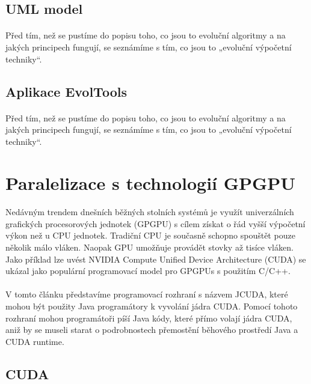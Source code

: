 \documentclass[bc,male,java,dept460]{diploma}		%
\begin{document}
\subsection{UML model}
\paragraph*{}
Před tím, než se pustíme do popisu toho, co jsou to evoluční algoritmy a na jakých principech fungují, se seznámíme s tím, co jsou to „evoluční výpočetní techniky“.

\subsection{Aplikace EvolTools}
\paragraph*{}
Před tím, než se pustíme do popisu toho, co jsou to evoluční algoritmy a na jakých principech fungují, se seznámíme s tím, co jsou to „evoluční výpočetní techniky“.

\section{Paralelizace s technologií GPGPU}
\paragraph*{}
Nedávným trendem dnešních běžných stolních systémů je využít univerzálních grafických procesorových jednotek (GPGPU) s cílem získat o řád vyšší výpočetní výkon než u CPU jednotek. Tradiční CPU je současně schopno spouštět pouze několik málo vláken. Naopak GPU umožňuje provádět stovky až tisíce vláken.
Jako příklad lze uvést NVIDIA Compute Unified Device Architecture (CUDA) se ukázal jako populární programovací model pro GPGPUs s použitím C/C++.

\paragraph*{}
V tomto článku představíme programovací rozhraní s názvem JCUDA, které mohou být použity Java programátory k vyvolání jádra CUDA. Pomocí tohoto rozhraní mohou programátoři píší Java kódy, které přímo volají jádra CUDA, aniž by se museli starat o podrobnostech přemostění běhového prostředí Java a CUDA runtime.

\subsection{CUDA}
\end{document}
